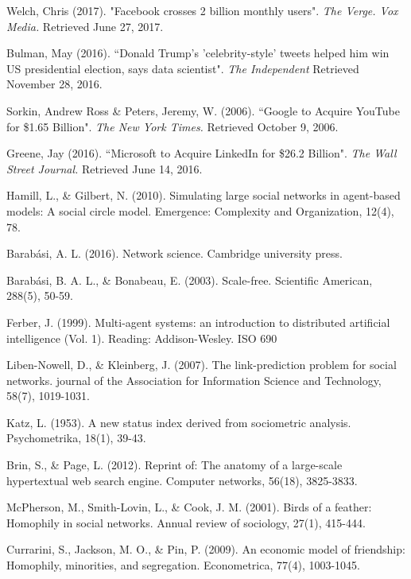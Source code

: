 \documentclass[a4paper,12pt]{article}
\begin{document}
\begin{thebibliography}{9}
  Welch, Chris (2017). "Facebook crosses 2 billion monthly users". \textit{The Verge. Vox Media.} Retrieved June 27, 2017.
  
  Bulman, May (2016). ``Donald Trump's 'celebrity-style' tweets helped him win US presidential election, says data scientist".
\textit{The Independent} Retrieved November 28, 2016.

   Sorkin, Andrew Ross \& Peters, Jeremy, W. (2006). ``Google to Acquire YouTube for \$1.65 Billion". \textit{The New York Times.} Retrieved October 9, 2006.

   Greene, Jay (2016). ``Microsoft to Acquire LinkedIn for \$26.2 Billion". \textit{The Wall Street Journal.} Retrieved June 14, 2016.

  Hamill, L., \& Gilbert, N. (2010). Simulating large social networks in agent-based models: A social circle model. Emergence: Complexity and Organization, 12(4), 78.

  Barabási, A. L. (2016). Network science. Cambridge university press.
  
  Barabási, B. A. L., \& Bonabeau, E. (2003). Scale-free. Scientific American, 288(5), 50-59.
  
  Ferber, J. (1999). Multi-agent systems: an introduction to distributed artificial intelligence (Vol. 1). Reading: Addison-Wesley.
ISO 690	

  Liben-Nowell, D., \& Kleinberg, J. (2007). The link-prediction problem for social networks. journal of the Association for Information Science and Technology, 58(7), 1019-1031.
  
  Katz, L. (1953). A new status index derived from sociometric analysis. Psychometrika, 18(1), 39-43.

  Brin, S., \& Page, L. (2012). Reprint of: The anatomy of a large-scale hypertextual web search engine. Computer networks, 56(18), 3825-3833.

  McPherson, M., Smith-Lovin, L., \& Cook, J. M. (2001). Birds of a feather: Homophily in social networks. Annual review of sociology, 27(1), 415-444.
  
  Currarini, S., Jackson, M. O., \& Pin, P. (2009). An economic model of friendship: Homophily, minorities, and segregation. Econometrica, 77(4), 1003-1045.
  

\end{thebibliography}
\end{document}
